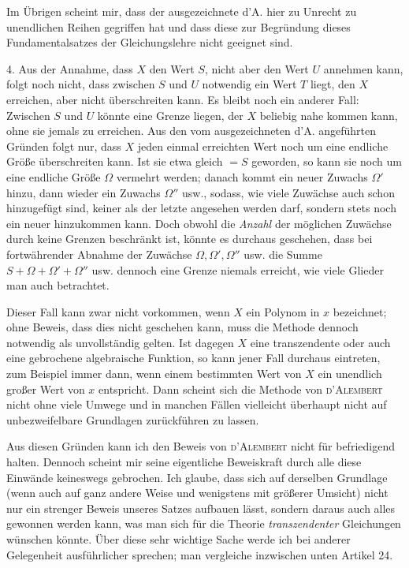 Im Übrigen scheint mir, dass der ausgezeichnete d'A. hier zu Unrecht zu unendlichen Reihen gegriffen hat und dass diese zur Begründung dieses Fundamentalsatzes der Gleichungslehre nicht geeignet sind.

4. Aus der Annahme, dass $X$ den Wert $S$, nicht aber den Wert $U$ annehmen kann, folgt noch nicht, dass zwischen $S$ und $U$ notwendig ein Wert $T$ liegt, den $X$ erreichen, aber nicht überschreiten kann. Es bleibt noch ein anderer Fall: Zwischen $S$ und $U$ könnte eine Grenze liegen, der $X$ beliebig nahe kommen kann, ohne sie jemals zu erreichen. Aus den vom ausgezeichneten d'A. angeführten Gründen folgt nur, dass $X$ jeden einmal erreichten Wert noch um eine endliche Größe überschreiten kann. Ist sie etwa gleich $=S$ geworden, so kann sie noch um eine endliche Größe $\Omega$ vermehrt werden; danach kommt ein neuer Zuwachs $\Omega'$ hinzu, dann wieder ein Zuwachs $\Omega''$ usw., sodass, wie viele Zuwächse auch schon hinzugefügt sind, keiner als der letzte angesehen werden darf, sondern stets noch ein neuer hinzukommen kann. Doch obwohl die \textit{Anzahl} der möglichen Zuwächse durch keine Grenzen beschränkt ist, könnte es durchaus geschehen, dass bei fortwährender Abnahme der Zuwächse $\Omega,\Omega',\Omega''$ usw. die Summe $S+\Omega+\Omega'+\Omega''$ usw. dennoch eine Grenze niemals erreicht, wie viele Glieder man auch betrachtet.

Dieser Fall kann zwar nicht vorkommen, wenn $X$ ein Polynom in $x$ bezeichnet; ohne Beweis, dass dies nicht geschehen kann, muss die Methode dennoch notwendig als unvollständig gelten. Ist dagegen $X$ eine transzendente oder auch eine gebrochene algebraische Funktion, so kann jener Fall durchaus eintreten, zum Beispiel immer dann, wenn einem bestimmten Wert von $X$ ein unendlich großer Wert von $x$ entspricht. Dann scheint sich die Methode von \textsc{d'Alembert} nicht ohne viele Umwege und in manchen Fällen vielleicht überhaupt nicht auf unbezweifelbare Grundlagen zurückführen zu lassen.

Aus diesen Gründen kann ich den Beweis von \textsc{d'Alembert} nicht für befriedigend halten. Dennoch scheint mir seine eigentliche Beweiskraft durch alle diese Einwände keineswegs gebrochen. Ich glaube, dass sich auf derselben Grundlage (wenn auch auf ganz andere Weise und wenigstens mit größerer Umsicht) nicht nur ein strenger Beweis unseres Satzes aufbauen lässt, sondern daraus auch alles gewonnen werden kann, was man sich für die Theorie \textit{transzendenter} Gleichungen wünschen könnte. Über diese sehr wichtige Sache werde ich bei anderer Gelegenheit ausführlicher sprechen; man vergleiche inzwischen unten Artikel 24.

